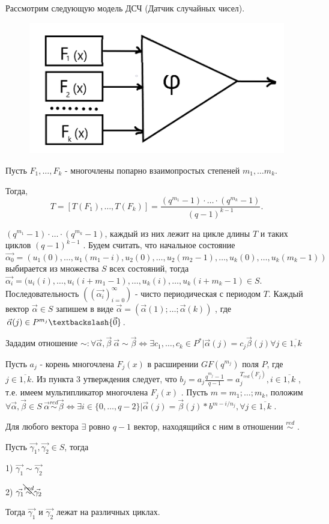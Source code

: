 Рассмотрим следующую модель ДСЧ (Датчик случайных чисел).\\

\begin{figure}[h!]
    \centering
    \includegraphics[scale=0.35]{DSC}
\end{figure}

Пусть $F_1, \dots, F_k$ - многочлены попарно взаимопростых степеней $m_1, \dots m_k$.

Тогда,
$$
T=[T(F_1), \dots, T(F_k)] = \frac{(q^{m_1} - 1) \cdot \ldots \cdot (q^{m_k} - 1)}{(q-1)^{k-1}}.
$$

$(q^{m_1} - 1) \cdot \dotsc \cdot (q^{m_k} - 1)$, каждый из них лежит на цикле длины $T$ и таких циклов $(q-1)^{k-1}$ . Будем считать, что начальное состояние $\vec{\alpha_0} = (u_1(0), \dots, u_1(m_1 - i),u_2(0),\dotsc, u_2(m_2-1), \dots, u_k(0), \dots, u_k(m_k-1))$ выбирается из множества $S$ всех состояний, тогда $\vec{\alpha_i}=(u_i(i), \dots, u_i(i+m_1-1), \dots, u_k(i), \dots, u_k(i+m_k-1) \in S$.
Последовательность $((\vec{\alpha_i})_{i=0}^{\infty})$ - чисто периодическая с периодом $T$.
Каждый вектор $\vec{\alpha} \in S$ запишем в виде $\vec{\alpha} = (\vec{\alpha}(1); \dots; \vec{\alpha}(k))$ , где $\vec{\alpha}(j) \in P^{m_j} \textbackslash \{\vec{0}\}$.

Зададим отношение $\sim : \forall \vec{\alpha}, \vec{\beta} \: \vec{\alpha}\sim\vec{\beta} \Leftrightarrow \exists c_1, \dots, c_k \in P^*|\vec{\alpha}(j) = c_j \vec{\beta}(j) \forall j \in \overline{1,k}$

Пусть $a_j$ - корень многочлена $F_j(x)$ в расширении $GF(q^{m_j})$ поля $P$, где $j \in \overline{1,k}$. Из пункта 3 утверждения следует, что $b_j = a_j \frac{q^{m_j}-1}{q-1} = a_j^{T_{red}(F_j)}, i \in \overline{1,k}$ , т.е. имеем мультипликатор многочлена $F_j(x)$ . Пусть $m=m_1; \dots; m_k$, положим $\forall \vec{\alpha}, \vec{\beta} \in S \: \vec{\alpha} \stackrel{red}{\sim} \vec{\beta} \Leftrightarrow \exists i \in \{0, \dots, q-2\} | \vec{\alpha}(j) = \vec{\beta}(j) * b^{m-i/n_j}, \forall j \in \overline{1,k}$ .

Для любого вектора $\exists$ ровно $q-1$ вектор, находящийся с ним в отношении $\stackrel{red}{\sim}$ .

\thr
Пусть $\vec{\gamma_1}, \vec{\gamma_2} \in S$, тогда

1) $\vec{\gamma_1} \sim \vec{\gamma_2}$

2) $\vec{\gamma_1} \bcancel{\stackrel{red}{\sim}} \vec{\gamma_2}$%

Тогда $\vec{\gamma_1}$ и $\vec{\gamma_2}$ лежат на различных циклах. 